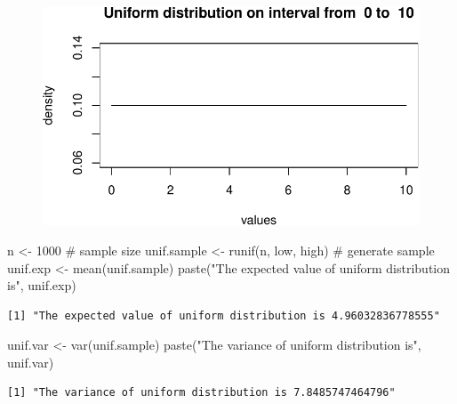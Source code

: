 \documentclass[
  letterpaper,
  DIV=11,
  numbers=noendperiod]{scrreprt}
\newenvironment{Shaded}{\begin{snugshade}}{\end{snugshade}}
\newcommand{\CommentTok}[1]{\textcolor[rgb]{0.37,0.37,0.37}{#1}}
\newcommand{\DecValTok}[1]{\textcolor[rgb]{0.68,0.00,0.00}{#1}}
\newcommand{\FunctionTok}[1]{\textcolor[rgb]{0.28,0.35,0.67}{#1}}
\newcommand{\NormalTok}[1]{\textcolor[rgb]{0.00,0.23,0.31}{#1}}
\newcommand{\OtherTok}[1]{\textcolor[rgb]{0.00,0.23,0.31}{#1}}
\newcommand{\StringTok}[1]{\textcolor[rgb]{0.13,0.47,0.30}{#1}}
\begin{document}
\begin{figure}[H]

{\centering \includegraphics{./04-distributions_files/figure-pdf/unnamed-chunk-9-1.pdf}

}

\end{figure}

\begin{Shaded}
\begin{Highlighting}[]
\NormalTok{n }\OtherTok{\textless{}{-}} \DecValTok{1000} \CommentTok{\# sample size}
\NormalTok{unif.sample }\OtherTok{\textless{}{-}} \FunctionTok{runif}\NormalTok{(n, low, high) }\CommentTok{\# generate sample}
\NormalTok{unif.exp }\OtherTok{\textless{}{-}} \FunctionTok{mean}\NormalTok{(unif.sample)}
\FunctionTok{paste}\NormalTok{(}\StringTok{"The expected value of uniform distribution is"}\NormalTok{, unif.exp)}
\end{Highlighting}
\end{Shaded}

\begin{verbatim}
[1] "The expected value of uniform distribution is 4.96032836778555"
\end{verbatim}

\begin{Shaded}
\begin{Highlighting}[]
\NormalTok{unif.var }\OtherTok{\textless{}{-}} \FunctionTok{var}\NormalTok{(unif.sample)}
\FunctionTok{paste}\NormalTok{(}\StringTok{"The variance of uniform distribution is"}\NormalTok{, unif.var)}
\end{Highlighting}
\end{Shaded}

\begin{verbatim}
[1] "The variance of uniform distribution is 7.8485747464796"
\end{verbatim}
\end{document}
